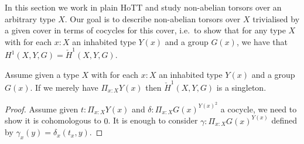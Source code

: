 \label{non-abelian-cech}


In this section we work in plain HoTT and study non-abelian torsors over an arbitrary type $X$. Our goal is to describe non-abelian torsors over $X$ trivialised by a given cover in terms of cocycles for this cover, i.e.\ to show that for any type $X$ with for each $x:X$ an inhabited type $Y(x)$ and a group $G(x)$, we have that $H^1(X,Y,G) = \check{H}^1(X,Y,G)$.




\begin{lemma}\label{first-cech-has-section-vanish}
Assume given a type $X$ with for each $x:X$ an inhabited type $Y(x)$ and a group $G(x)$. If we merely have $\Pi_{x:X}Y(x)$ then $\check{H}^1(X,Y,G)$ is a singleton.
\end{lemma}

\begin{proof}
  Assume given $t: \Pi_{x:X} Y(x)$ and $\delta:\Pi_{x:X}G(x)^{Y(x)^2}$ a cocycle, we need to show it is cohomologous to $0$. It is enough to consider $\gamma:\Pi_{x:X}G(x)^{Y(x)}$ defined by $\gamma_x(y) = \delta_x(t_x,y)$.
\end{proof}

